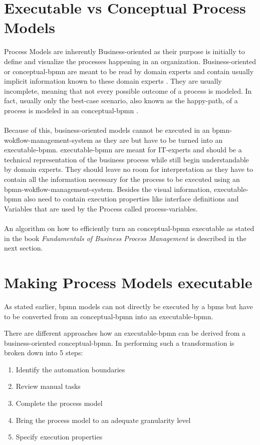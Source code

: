 \section{Executable vs Conceptual Process Models}
Process Models are inherently Business-oriented as their purpose is initially to define and visualize the processes happening in an organization. Business-oriented or  \gls{conceptual-bpmn} are meant to be read by domain experts and contain usually implicit information known to these domain experts \cite{fundamentals}. They are usually incomplete, meaning that not every possible outcome of a process is modeled. In fact, usually only the best-case scenario, also known as the \gls{happy-path}, of a process is modeled in an \gls{conceptual-bpmn} \cite{freund2019real}. \\~\\Because of this, business-oriented models cannot be executed in an \gls{bpmn-wokflow-management-system} as they are but have to be turned into an \gls{executable-bpmn}. \gls{executable-bpmn} are meant for IT-experts and should be a technical representation of the business process while still begin understandable by domain experts. They should leave no room for interpretation as they have to contain all the information necessary for the process to be executed using an \gls{bpmn-wokflow-management-system}. Besides the visual information, \gls{executable-bpmn} also need to contain execution properties like interface definitions and Variables that are used by the Process called \gls{process-variables}.\cite{fundamentals} \\~\\An algorithm on how to efficiently turn an \gls{conceptual-bpmn} executable as stated in the book \textit{Fundamentals of Business Process Management} \cite{fundamentals} is described in the next section. 

\section{Making Process Models executable}
As stated earlier, \gls{bpmn} models can not directly be executed by a \gls{bpms} but have to be converted from an \gls{conceptual-bpmn} into an \gls{executable-bpmn}. 

There are different approaches how an \gls{executable-bpmn} can be derived from a business-oriented \gls{conceptual-bpmn}. In \cite{fundamentals} performing such a transformation is broken down into 5 steps:
\begin{enumerate}
	\item Identify the automation boundaries
	\item Review manual tasks
	\item Complete the process model
	\item Bring the process model to an adequate granularity level
	\item Specify execution properties
\end{enumerate}

